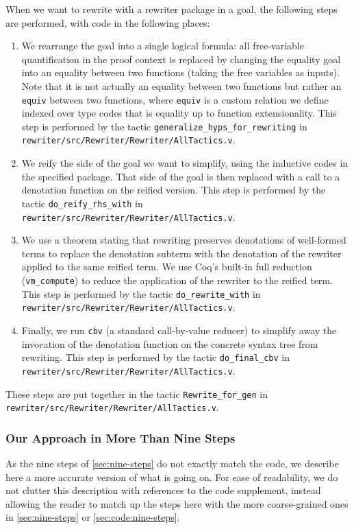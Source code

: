 \begin{subappendices}
When we want to rewrite with a rewriter package in a goal, the following steps are performed, with code in the following places:
\begin{enumerate}
  \item
    We rearrange the goal into a single logical formula: all free-variable quantification in the proof context is replaced by changing the equality goal into an equality between two functions (taking the free variables as inputs).
    Note that it is not actually an equality between two functions but rather an \texttt{equiv} between two functions, where \texttt{equiv} is a custom relation we define indexed over type codes that is equality up to function extensionality.
    This step is performed by the tactic \texttt{generalize\_hyps\_for\_rewriting} in \texttt{rewriter/src/Rewriter/Rewriter/AllTactics.v}.
  \item
    We reify the side of the goal we want to simplify, using the inductive codes in the specified package.  That side of the goal is then replaced with a call to a denotation function on the reified version.
    This step is performed by the tactic \texttt{do\_reify\_rhs\_with} in \texttt{rewriter/src/Rewriter/Rewriter/AllTactics.v}.
  \item
    We use a theorem stating that rewriting preserves denotations of well-formed terms to replace the denotation subterm with the denotation of the rewriter applied to the same reified term.
    We use Coq's built-in full reduction (\texttt{vm\_compute}) to reduce the application of the rewriter to the reified term.
    This step is performed by the tactic \texttt{do\_rewrite\_with} in \texttt{rewriter/src/Rewriter/Rewriter/AllTactics.v}.
  \item
    Finally, we run \texttt{cbv} (a standard call-by-value reducer) to simplify away the invocation of the denotation function on the concrete syntax tree from rewriting.
    This step is performed by the tactic \texttt{do\_final\_cbv} in \texttt{rewriter/src/Rewriter/Rewriter/AllTactics.v}.
\end{enumerate}
These steps are put together in the tactic \texttt{Rewrite\_for\_gen} in \texttt{rewriter/src/Rewriter/Rewriter/AllTactics.v}.

\subsubsection{Our Approach in More Than Nine Steps}

As the nine steps of \autoref{sec:nine-steps} do not exactly match the code, we describe here a more accurate version of what is going on.
For ease of readability, we do not clutter this description with references to the code supplement, instead allowing the reader to match up the steps here with the more coarse-grained ones in \autoref{sec:nine-steps} or \autoref{sec:code:nine-steps}.


\end{subappendices}
